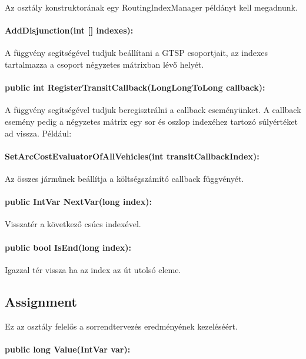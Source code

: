 Az osztály konstruktorának egy RoutingIndexManager példányt kell megadnunk.



\paragraph{AddDisjunction(int [] indexes):}

A függvény segítségével tudjuk beállítani a GTSP csoportjait, az indexes tartalmazza a csoport négyzetes mátrixban lévő helyét.

\paragraph{public int RegisterTransitCallback(LongLongToLong callback):}

A függvény segítségével tudjuk beregisztrálni a callback eseményünket. A callback esemény pedig a négyzetes mátrix egy sor és oszlop indexéhez tartozó súlyértéket ad vissza. Például:

\paragraph{SetArcCostEvaluatorOfAllVehicles(int transitCallbackIndex):} 

Az összes járműnek beállítja a költségszámító callback függvényét.

\paragraph{public IntVar NextVar(long index):}
Visszatér a következő csúcs indexével.

\paragraph{public bool IsEnd(long index):}

Igazzal tér vissza ha az index az út utolsó eleme.

\subsection{Assignment}

Ez az osztály felelős a sorrendtervezés eredményének kezeléséért.

\paragraph{public long Value(IntVar var):}

